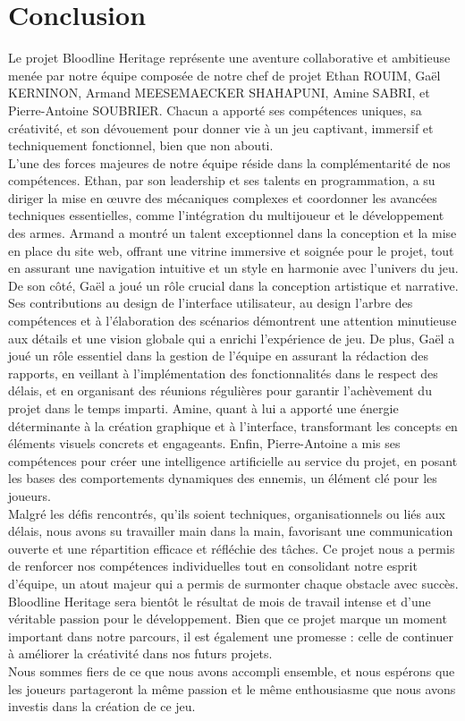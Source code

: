 \documentclass{report}
\begin{document}
\chapter*{Conclusion}
Le projet Bloodline Heritage représente une aventure collaborative et ambitieuse menée par notre équipe composée de notre chef de projet Ethan ROUIM, Gaël KERNINON, Armand MEESEMAECKER SHAHAPUNI, Amine SABRI, et Pierre-Antoine SOUBRIER. Chacun a apporté ses compétences uniques, sa créativité, et son dévouement pour donner vie à un jeu captivant, immersif et techniquement fonctionnel, bien que non abouti.
\\[0.4cm]
L’une des forces majeures de notre équipe réside dans la complémentarité de nos compétences. Ethan, par son leadership et ses talents en programmation, a su diriger la mise en œuvre des mécaniques complexes et coordonner les avancées techniques essentielles, comme l’intégration du multijoueur et le développement des armes. Armand a montré un talent exceptionnel dans la conception et la mise en place du site web, offrant une vitrine immersive et soignée pour le projet, tout en assurant une navigation intuitive et un style en harmonie avec l’univers du jeu.
\\[0.4cm]
De son côté, Gaël a joué un rôle crucial dans la conception artistique et narrative. Ses contributions au design de l’interface utilisateur, au design l’arbre des compétences et à l’élaboration des scénarios démontrent une attention minutieuse aux détails et une vision globale qui a enrichi l’expérience de jeu. De plus, Gaël a joué un rôle essentiel dans la gestion de l'équipe en assurant la rédaction des rapports, en veillant à l'implémentation des fonctionnalités dans le respect des délais, et en organisant des réunions régulières pour garantir l'achèvement du projet dans le temps imparti.  Amine, quant à lui a apporté une énergie déterminante à la création graphique et à l’interface, transformant les concepts en éléments visuels concrets et engageants. Enfin, Pierre-Antoine a mis ses compétences pour créer une intelligence artificielle au service du projet, en posant les bases des comportements dynamiques des ennemis, un élément clé pour les joueurs.
\\[0.4cm]
Malgré les défis rencontrés, qu'ils soient techniques, organisationnels ou liés aux délais, nous avons su travailler main dans la main, favorisant une communication ouverte et une répartition efficace et réfléchie des tâches. Ce projet nous a permis de renforcer nos compétences individuelles tout en consolidant notre esprit d’équipe, un atout majeur qui a permis de surmonter chaque obstacle avec succès.
\\[0.4cm]
Bloodline Heritage sera bientôt le résultat de mois de travail intense et d’une véritable passion pour le développement. Bien que ce projet marque un moment important dans notre parcours, il est également une promesse : celle de continuer à améliorer la créativité dans nos futurs projets.
\\[0.4cm]
Nous sommes fiers de ce que nous avons accompli ensemble, et nous espérons que les joueurs partageront la même passion et le même enthousiasme que nous avons investis dans la création de ce jeu.
\end{document}
